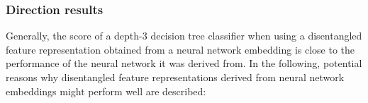 




\subsubsection{Direction results}


Generally, the score of a depth-3  decision tree classifier when using a disentangled feature representation obtained from a neural network embedding is  close to the performance of the neural network it was derived from. In the following, potential reasons why disentangled feature representations derived from neural network embeddings might perform well are described:

